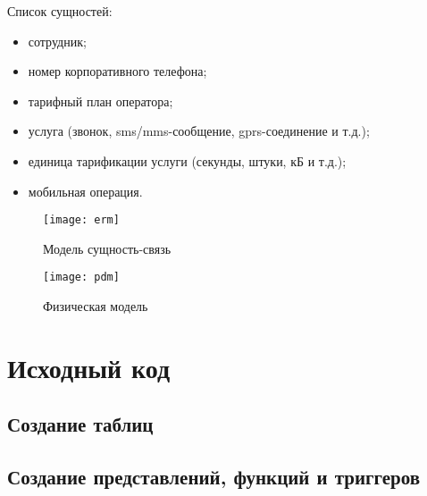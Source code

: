 \documentclass[10pt, a4paper]{article}
\begin{document}
Список сущностей:
\begin{itemize}
	\item сотрудник;
	\item номер корпоративного телефона;
	\item тарифный план оператора;
	\item услуга (звонок, sms/mms-сообщение, gprs-соединение и т.д.);
	\item единица тарификации услуги (секунды, штуки, кБ и т.д.);
	\item мобильная операция.
\end{itemize}

\begin{figure}[H]
	\centering
	\texttt{[image: erm]}
	\caption{Модель сущность-связь}
	\label{fig:erm}
\end{figure}

\begin{figure}[H]
	\centering
	\texttt{[image: pdm]}
	\caption{Физическая модель}
	\label{fig:pdm}
\end{figure}

\section{Исходный код}

\subsection{Создание таблиц}


\subsection{Создание представлений, функций и триггеров}

\end{document}

